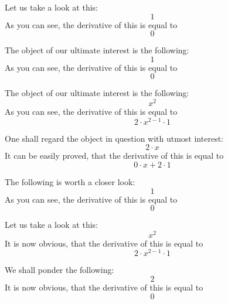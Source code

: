 \documentclass{article}
\begin{document}
Let us take a look at this:
\begin{equation}
1 
\end{equation}
As you can see, the derivative of this is equal to
\begin{equation}
0 
\end{equation}

The object of our ultimate interest is the following:
\begin{equation}
1 
\end{equation}
As you can see, the derivative of this is equal to
\begin{equation}
0 
\end{equation}

The object of our ultimate interest is the following:
\begin{equation}
x ^{2 } 
\end{equation}
As you can see, the derivative of this is equal to
\begin{equation}
2 \cdot x ^{2 - 1 } \cdot 1 
\end{equation}

One shall regard the object in question with utmost interest:
\begin{equation}
2 \cdot x 
\end{equation}
It can be easily proved, that the derivative of this is equal to
\begin{equation}
0 \cdot x + 2 \cdot 1 
\end{equation}

The following is worth a closer look:
\begin{equation}
1 
\end{equation}
As you can see, the derivative of this is equal to
\begin{equation}
0 
\end{equation}

Let us take a look at this:
\begin{equation}
x ^{2 } 
\end{equation}
It is now obvious, that the derivative of this is equal to
\begin{equation}
2 \cdot x ^{2 - 1 } \cdot 1 
\end{equation}

We shall ponder the following:
\begin{equation}
2 
\end{equation}
It is now obvious, that the derivative of this is equal to
\begin{equation}
0 
\end{equation}
\end{document}

